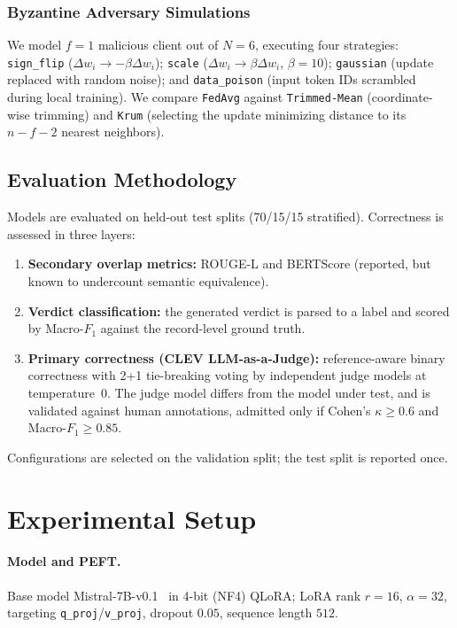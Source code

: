 \documentclass[11pt,a4paper]{article}
\begin{document}
\subsubsection{Byzantine Adversary Simulations}
We model $f{=}1$ malicious client out of $N{=}6$, executing four strategies: \texttt{sign\_flip} ($\Delta w_i \to -\beta \Delta w_i$); \texttt{scale} ($\Delta w_i \to \beta \Delta w_i$, $\beta{=}10$); \texttt{gaussian} (update replaced with random noise); and \texttt{data\_poison} (input token IDs scrambled during local training). We compare \texttt{FedAvg} against \texttt{Trimmed-Mean} (coordinate-wise trimming) and \texttt{Krum} (selecting the update minimizing distance to its $n{-}f{-}2$ nearest neighbors).

\subsection{Evaluation Methodology}
Models are evaluated on held-out test splits (70/15/15 stratified). Correctness is assessed in three layers:
\begin{enumerate}
    \item \textbf{Secondary overlap metrics:} ROUGE-L and BERTScore (reported, but known to undercount semantic equivalence).
    \item \textbf{Verdict classification:} the generated verdict is parsed to a label and scored by Macro-$F_1$ against the record-level ground truth.
    \item \textbf{Primary correctness (CLEV LLM-as-a-Judge):} reference-aware binary correctness with 2+1 tie-breaking voting by independent judge models at temperature~0. The judge model differs from the model under test, and is validated against human annotations, admitted only if Cohen's $\kappa \ge 0.6$ and Macro-$F_1 \ge 0.85$.
\end{enumerate}
Configurations are selected on the validation split; the test split is reported once.

\section{Experimental Setup}
\paragraph{Model and PEFT.} Base model Mistral-7B-v0.1~\cite{jiang2023mistral} in 4-bit (NF4) QLoRA; LoRA rank $r{=}16$, $\alpha{=}32$, targeting \texttt{q\_proj}/\texttt{v\_proj}, dropout $0.05$, sequence length $512$.
\end{document}
